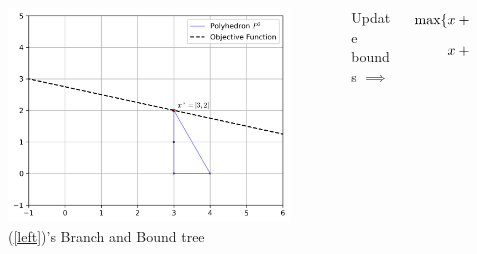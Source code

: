 \documentclass{beamer}
\begin{document}
\begin{frame}[t]
\begin{columns}[T]
\begin{column}{0.45\textwidth}
\begin{figure}[]
					\hfill
					\includegraphics[width=.45\textwidth]{P2.png}
					\captionsetup{font=footnotesize,labelfont=footnotesize}
					\caption{(\ref{left})'s Branch and Bound tree}
					\label{p:before}
				\end{figure}
			\end{column}
			\begin{column}{0.10\textwidth}
				\vspace{2.5cm}
				\centering
				Update bounds $ \implies $
			\end{column}
			\begin{column}{0.45\textwidth}
				\vspace{-.75cm}
				\begin{align}
					\begin{split}
						\text{max} \{ &x + 4y : -\frac{x}{2} + y \leq 3, \\
						&x + \frac{y}{2} \leq 5, (x, y) \in \mathbb{Z}^2_+ \} 
					\end{split}
					\label{right}
				\end{align}
				\vspace{-.5cm}
				\begin{figure}[h]
\end{figure}
\end{column}
\end{columns}
\end{frame}
\end{document}
